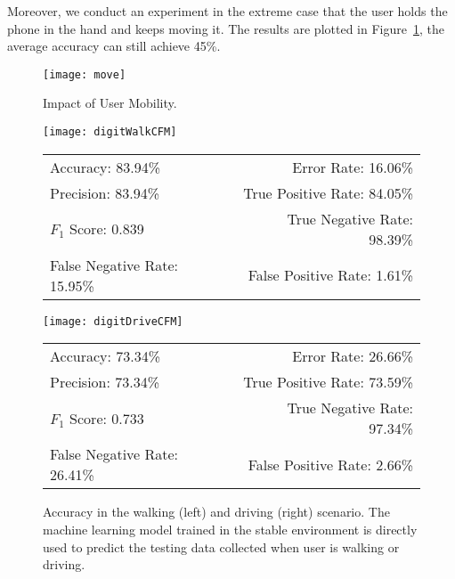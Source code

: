 Moreover, we conduct an experiment in the extreme case that the user holds the phone in the hand and keeps moving it. The results are plotted in Figure~\ref{fig:move}, the average accuracy can still achieve 45\%.

\begin{figure}[!h]
	\centering
	\texttt{[image: move]}
	\caption{Impact of User Mobility.}
	\label{fig:move}
\end{figure}


\begin{landscape}
	\begin{figure}[!h]
		\centering
		\begin{minipage}[c]{.48\linewidth}
			\centering
			\texttt{[image: digitWalkCFM]}
			\begin{tabular}{lr}
				\toprule
				Accuracy: 83.94\% & \hspace{-.00in} Error Rate: 16.06\% \\
				Precision: 83.94\% & \hspace{-.00in} True Positive Rate: 84.05\% \\
				$F_1$ Score: 0.839 & \hspace{-.00in} True Negative Rate: 98.39\% \\
				False Negative Rate: 15.95\% & \hspace{-.00in} False Positive Rate: 1.61\% \\
				\bottomrule
			\end{tabular}
		\end{minipage}
		\begin{minipage}[c]{.48\linewidth}
			\centering
			\texttt{[image: digitDriveCFM]}
			\begin{tabular}{lr}
				\toprule
				Accuracy: 73.34\% & \hspace{-.00in} Error Rate: 26.66\% \\
				Precision: 73.34\% & \hspace{-.00in} True Positive Rate: 73.59\% \\
				$F_1$ Score: 0.733 & \hspace{-.00in} True Negative Rate: 97.34\% \\
				False Negative Rate: 26.41\% & \hspace{-.00in} False Positive Rate: 2.66\% \\
				\bottomrule
			\end{tabular}
		\end{minipage}
		\caption[Accuracy in the walking (left) and driving (right) scenario.]{Accuracy in the walking (left) and driving (right) scenario. The machine learning model trained in the stable environment is directly used to predict the testing data collected when user is walking or driving.}
		\label{fig: walkanddrive}
	\end{figure}
\end{landscape}



